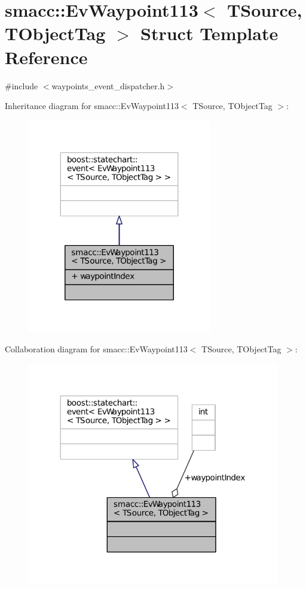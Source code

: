 \hypertarget{structsmacc_1_1EvWaypoint113}{}\section{smacc\+:\+:Ev\+Waypoint113$<$ T\+Source, T\+Object\+Tag $>$ Struct Template Reference}
\label{structsmacc_1_1EvWaypoint113}


{\ttfamily \#include $<$waypoints\+\_\+event\+\_\+dispatcher.\+h$>$}



Inheritance diagram for smacc\+:\+:Ev\+Waypoint113$<$ T\+Source, T\+Object\+Tag $>$\+:
\nopagebreak
\begin{figure}[H]
\begin{center}
\leavevmode
\includegraphics[width=227pt]{structsmacc_1_1EvWaypoint113__inherit__graph}
\end{center}
\end{figure}


Collaboration diagram for smacc\+:\+:Ev\+Waypoint113$<$ T\+Source, T\+Object\+Tag $>$\+:
\nopagebreak
\begin{figure}[H]
\begin{center}
\leavevmode
\includegraphics[width=312pt]{structsmacc_1_1EvWaypoint113__coll__graph}
\end{center}
\end{figure}
